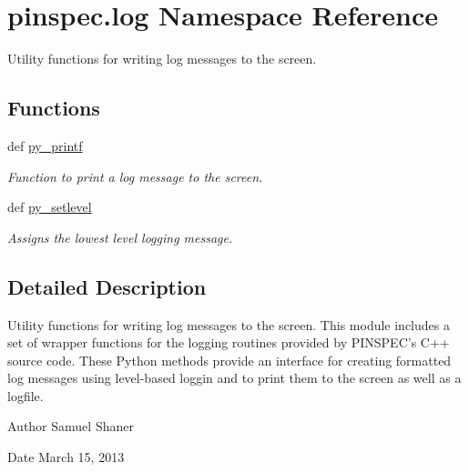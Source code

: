 \hypertarget{namespacepinspec_1_1log}{\section{pinspec.\-log Namespace Reference}
\label{namespacepinspec_1_1log}
}


Utility functions for writing log messages to the screen.  


\subsection*{Functions}
\begin{DoxyCompactItemize}
\item 
def \hyperlink{namespacepinspec_1_1log_a541e006b2440f460574f9f3017279a1d}{py\-\_\-printf}
\begin{DoxyCompactList}\small\item\em Function to print a log message to the screen. \end{DoxyCompactList}\item 
def \hyperlink{namespacepinspec_1_1log_a4a96627ffacfa0a93779f42222ecff22}{py\-\_\-setlevel}
\begin{DoxyCompactList}\small\item\em Assigns the lowest level logging message. \end{DoxyCompactList}\end{DoxyCompactItemize}


\subsection{Detailed Description}
Utility functions for writing log messages to the screen. This module includes a set of wrapper functions for the logging routines provided by P\-I\-N\-S\-P\-E\-C's C++ source code. These Python methods provide an interface for creating formatted log messages using level-\/based loggin and to print them to the screen as well as a logfile. \begin{DoxyAuthor}{Author}
Samuel Shaner 
\end{DoxyAuthor}
\begin{DoxyDate}{Date}
March 15, 2013 
\end{DoxyDate}


